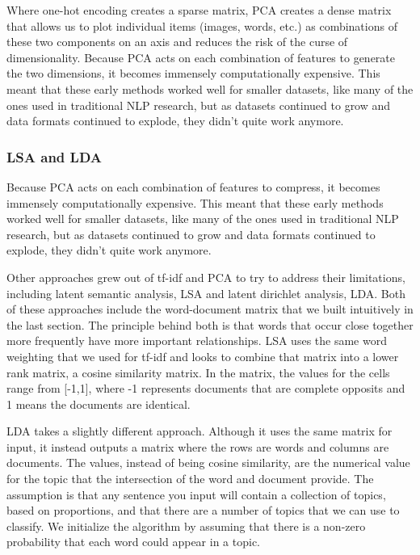 \documentclass[draft, 11pt]{diazessay} %
\begin{document}
Where one-hot encoding creates a sparse matrix, PCA creates a dense matrix that  allows us to plot individual items (images, words, etc.) as combinations of these two components on an axis and reduces the risk of the curse of dimensionality. Because PCA acts on each combination of features to generate the two dimensions, it becomes immensely computationally expensive.  This meant that these early methods worked well for smaller datasets, like many of the ones used in traditional NLP research,  but as datasets continued to grow and data formats continued to explode, they didn’t quite work anymore. 


\subsubsection{LSA and LDA}
Because PCA acts on each combination of features to compress, it becomes immensely computationally expensive.  This meant that these early methods worked well for smaller datasets, like many of the ones used in traditional NLP research,  but as datasets continued to grow and data formats continued to explode, they didn’t quite work anymore.   

Other approaches grew out of tf-idf and PCA to try to address their limitations, including latent semantic analysis, LSA and latent dirichlet analysis, LDA\cite{cvitanic2016lda}.  Both of these approaches include the word-document matrix that we built intuitively in the last section. The principle behind both is that words that occur close together more frequently have more important relationships.  LSA uses the same word weighting that we used for tf-idf and looks to combine that matrix into a lower rank matrix, a cosine similarity matrix. In the matrix, the values for the cells range from [-1,1], where -1 represents documents that are complete opposits and 1 means the documents are identical. 

LDA takes a slightly different approach. Although it uses the same matrix for input, it instead outputs a matrix where the rows are words and columns are documents. The values, instead of being cosine similarity, are the numerical value for the topic that the intersection of the word and document provide.  The assumption is that any sentence you input will contain a collection of topics, based on proportions, and that there are a number of topics that we can use to classify. We initialize the algorithm by assuming that there is a non-zero probability that each word could appear in a topic. 
\end{document}
